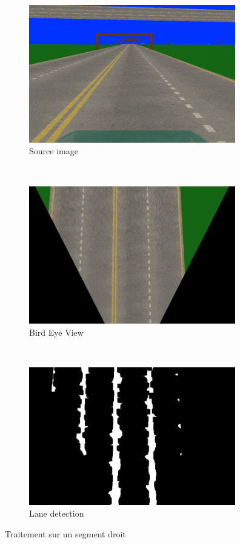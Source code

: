\documentclass[12pt, openany]{report}
\begin{document}
\begin{figure}[!h]
     \centering
     \begin{subfigure}[b]{0.3\textwidth}
         \centering
         \includegraphics[width=\textwidth, height = 6cm]{image.png}
         \caption{Source image}
     \end{subfigure}
     ~
     \begin{subfigure}[b]{0.3\textwidth}
         \centering
         \includegraphics[width=\textwidth, height = 6cm]{birdView.png}
         \caption{Bird Eye View}
     \end{subfigure}
     ~
     \begin{subfigure}[b]{0.3\textwidth}
         \centering
         \includegraphics[width=\textwidth, height = 6cm]{postProcess.png}
         \caption{Lane detection}
     \end{subfigure}
        \caption{Traitement sur un segment droit}
        \label{fig:three graphs}
\end{figure}
\end{document}
